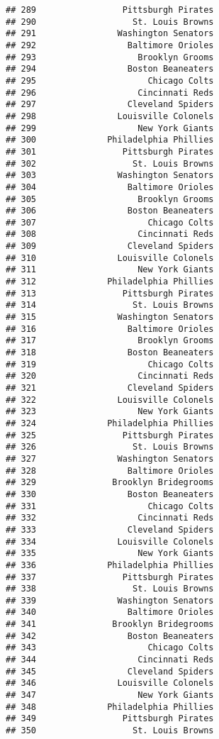 \documentclass[]{article}
\begin{document}
\begin{verbatim}
## 289                 Pittsburgh Pirates
## 290                   St. Louis Browns
## 291                Washington Senators
## 292                  Baltimore Orioles
## 293                    Brooklyn Grooms
## 294                  Boston Beaneaters
## 295                      Chicago Colts
## 296                    Cincinnati Reds
## 297                  Cleveland Spiders
## 298                Louisville Colonels
## 299                    New York Giants
## 300              Philadelphia Phillies
## 301                 Pittsburgh Pirates
## 302                   St. Louis Browns
## 303                Washington Senators
## 304                  Baltimore Orioles
## 305                    Brooklyn Grooms
## 306                  Boston Beaneaters
## 307                      Chicago Colts
## 308                    Cincinnati Reds
## 309                  Cleveland Spiders
## 310                Louisville Colonels
## 311                    New York Giants
## 312              Philadelphia Phillies
## 313                 Pittsburgh Pirates
## 314                   St. Louis Browns
## 315                Washington Senators
## 316                  Baltimore Orioles
## 317                    Brooklyn Grooms
## 318                  Boston Beaneaters
## 319                      Chicago Colts
## 320                    Cincinnati Reds
## 321                  Cleveland Spiders
## 322                Louisville Colonels
## 323                    New York Giants
## 324              Philadelphia Phillies
## 325                 Pittsburgh Pirates
## 326                   St. Louis Browns
## 327                Washington Senators
## 328                  Baltimore Orioles
## 329               Brooklyn Bridegrooms
## 330                  Boston Beaneaters
## 331                      Chicago Colts
## 332                    Cincinnati Reds
## 333                  Cleveland Spiders
## 334                Louisville Colonels
## 335                    New York Giants
## 336              Philadelphia Phillies
## 337                 Pittsburgh Pirates
## 338                   St. Louis Browns
## 339                Washington Senators
## 340                  Baltimore Orioles
## 341               Brooklyn Bridegrooms
## 342                  Boston Beaneaters
## 343                      Chicago Colts
## 344                    Cincinnati Reds
## 345                  Cleveland Spiders
## 346                Louisville Colonels
## 347                    New York Giants
## 348              Philadelphia Phillies
## 349                 Pittsburgh Pirates
## 350                   St. Louis Browns

\end{verbatim}
\end{document}
